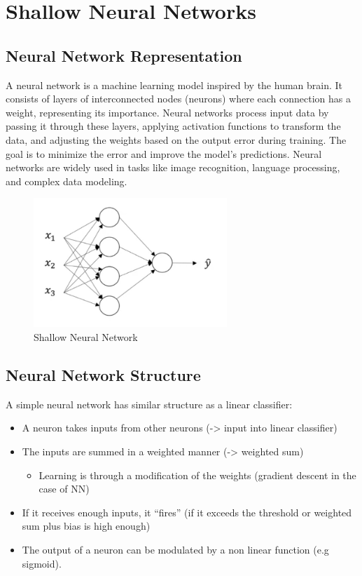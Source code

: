 \documentclass[letterpaper,12pt,notitlepage,twoside]{report}
\begin{document}
\section{Shallow Neural Networks}
\subsection{Neural Network Representation}
A neural network is a machine learning model inspired by the human brain. It consists of layers of interconnected nodes (neurons) where each connection has a weight, representing its importance. Neural networks process input data by passing it through these layers, applying activation functions to transform the data, and adjusting the weights based on the output error during training. The goal is to minimize the error and improve the model's predictions. Neural networks are widely used in tasks like image recognition, language processing, and complex data modeling.

\begin{figure}[h]
	\centering
	\includegraphics[width=0.65\textwidth]{Images/Shallow Neural Network.png}
	\caption{Shallow Neural Network}
	\label{fig:11}
\end{figure}

\subsection{Neural Network Structure}
A simple neural network has similar structure as a linear classifier:
\begin{itemize}[nosep]
\item A neuron takes inputs from other neurons (-> input into linear classifier)
\item The inputs are summed in a weighted manner (-> weighted sum)
	\begin{itemize}[label={}]
		\item Learning is through a modification of the weights (gradient descent in the case of NN)
	\end{itemize}
\item If it receives enough inputs, it “fires” (if it exceeds the threshold or weighted sum plus bias is high enough)
\item The output of a neuron can be modulated by a non linear function (e.g sigmoid).
\end{itemize}
\end{document}
